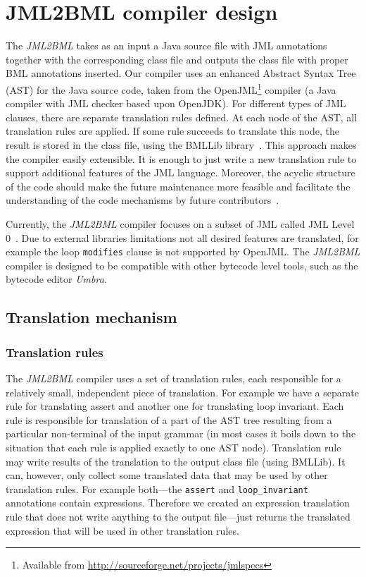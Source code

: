 \documentclass{llncs}
\newcommand{\jmltobmltext}{JML2BML}
\newcommand{\jmltobml}{\textsl{\jmltobmltext}\xspace}
\newcommand{\openjml}{OpenJML\xspace}
\newcommand{\bmllib}{BMLLib\xspace}
\newcommand{\hs}{\hspace{0.5pt}}
\begin{document}
\section{\jmltobmltext{} compiler design}
\label{sec:compiler}

The \jmltobml takes as an input a Java source file with JML annotations
together with the corresponding class file and outputs the class file
with proper BML annotations inserted. Our compiler uses an enhanced
Abstract Syntax Tree (AST) for the Java source code, taken from the
\openjml\footnote{Available from
\url{http://sourceforge.net/projects/jmlspecs}} compiler (a Java
compiler with JML checker based upon OpenJDK). For
different types of JML clauses, there are separate translation rules
defined. At each node of the AST, all translation rules are
applied. If some rule succeeds to translate this node, the result is
stored in the class file, using the \bmllib
library~\cite{bmllib}. This approach makes the compiler easily extensible. It
is enough to just write a new translation rule to support additional
features of the JML language. Moreover, the acyclic structure of the
code should make the future maintenance more feasible and facilitate
the understanding of the code mechanisms by future
contributors~\cite{Dijkstra70}.



Currently, the \jmltobml compiler focuses on a subset of JML
called JML Level 0~\cite[Sect. 2.9]{jmlrefman}. Due to external
libraries limitations not all desired features are translated, for
example the loop \texttt{modifies} clause is not supported by
\openjml. The \jmltobml compiler is designed to be compatible with
other bytecode level tools, such as the bytecode editor
\textit{Umbra}.


\subsection{Translation mechanism}

\subsubsection{Translation rules}
The \jmltobml compiler uses a set of translation rules, each
responsible for a relatively small, independent piece of
translation. For example we have a separate rule for translating
assert and another one for translating loop invariant. Each rule is responsible for translation of
a part of the AST tree resulting from a particular non-terminal of the
input grammar (in most cases it boils down to the situation that each
rule is applied exactly to one AST node). Translation rule may write
results of the translation to the output class file (using \bmllib). It
can, however, only collect some translated data that may be used by
other translation rules. For example both\hs{}---\hs{}the
\texttt{assert} and \texttt{loop\_invariant} annotations contain
expressions. Therefore we created an expression translation rule that does not write anything to the
output file\hs{}---\hs{}just returns the translated expression that
will be used in other translation rules.
\end{document}
